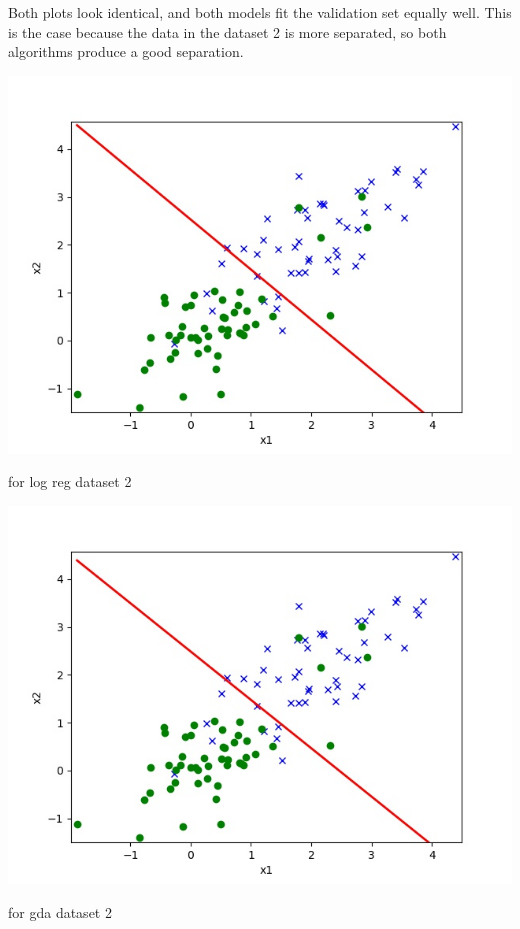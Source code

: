 \begin{answer}

Both plots look identical, and both models fit the validation set equally well. 
This is the case because the data in the dataset 2 is more separated, so both algorithms produce a good separation.

\includegraphics{logreg_pred_2.jpg}

for log reg dataset 2

\includegraphics{gda_pred_2.jpg}

for gda dataset 2

\end{answer}